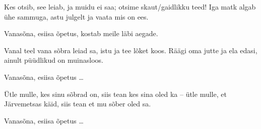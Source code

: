 Kes otsib, see leiab, ja muidu ei saa;
otsime skaut/gaidlikku teed!
Iga matk algab \"uhe sammuga,
astu julgelt ja vaata mis on ees.

Vanas\~ona, esiisa \~opetus,
kostab meile l\"abi aegade.

Vanal teel vana s\~obra leiad sa,
istu ja tee l\~oket koos.
R\"a\"agi oma jutte ja ela edasi,
ainult p\"u\"udlikud on muinasloos.

Vanas\~ona, esiisa \~opetus \ldots

\"Utle mulle, kes sinu s\~obrad on,
siis tean kes sina oled ka --
\"utle mulle, et J\"arvemetsas k\"aid,
siis tean et mu s\~ober oled sa.

Vanas\~ona, esiisa \~opetus \ldots
